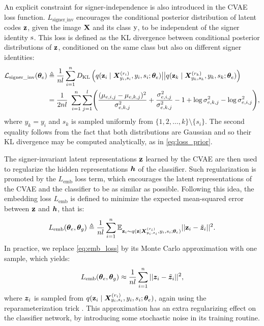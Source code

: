 An explicit constraint for signer-independence is also introduced in the CVAE loss function. $L_{\text{signer\_inv}}$ encourages the conditional posterior distribution of latent codes ${\mathbf{z}}$, given the image ${\mathbf{X}}$ and its class ${\textnormal{y}}$, to be independent of the signer identity ${\textnormal{s}}$. This loss is defined as the KL divergence between conditional posterior distributions of ${\mathbf{z}}$, conditioned on the same class but also on different signer identities:
\begin{align}
    \label{eq:loss_signer_inv}
    \mathcal{L}_{\text{signer\_inv}}({\bm{\theta}}_{e}) &\triangleq \frac{1}{nl} \sum_{i=1}^{n}D_{\mathrm{KL}}\left(q({\mathbf{z}}_{i} \mid {\bm{X}}^{(r_{i})}_{y_{i},s_{i}}, y_{i}, s_{i}; {\bm{\theta}}_e) \big| \big| q({\mathbf{z}}_{k} \mid {\bm{X}}^{(r_{k})}_{y_{k},s_{k}}, y_{k}, s_{k}; {\bm{\theta}}_e)\right) \nonumber\\
    &=\frac{1}{2nl}~\sum_{i=1}^{n}\sum_{j=1}^{l} \Biggl(\frac{(\mu_{e,i,j} - \mu_{e,k,j})^2}{\sigma_{e,k,j}^2} + \frac{\sigma_{e,i,j}^2}{\sigma_{e,k,j}^2} -1 + \log \sigma_{e,k,j}^2 - \log \sigma_{e,i,j}^2 \Biggr),
\end{align}
where $y_{k}=y_{i}$ and $s_k$ is sampled uniformly from $\{1,2,\dots,k\} \setminus \lbrace s_i \rbrace$. The second equality follows from the fact that both distributions are Gaussian and so their KL divergence may be computed analytically, as in \eqref{eq:loss_prior}.

The signer-invariant latent representations ${\mathbf{z}}$ learned by the CVAE are then used to regularize the hidden representations ${\bm{h}}$ of the classifier. Such regularization is promoted by the $L_{\text{emb}}$ loss term, which encourages the latent representations of the CVAE and the classifier to be as similar as possible. Following this idea, the embedding loss $L_{\text{emb}}$ is defined to minimize the expected mean-squared error between ${\mathbf{z}}$ and ${\bm{h}}$, that is:
\begin{equation}
    \label{eq:emb_loss}
    L_{\text{emb}}({\bm{\theta}}_e, {\bm{\theta}}_g) \triangleq \frac{1}{nl} \sum_{i=1}^{n} \mathbb{E}_{{\mathbf{z}}_{i} \sim q({\mathbf{z}} \mid {\bm{X}}^{(r_{i})}_{y_{i},s_{i}}, y_{i}, s_{i}; {\bm{\theta}}_e)}||{\mathbf{z}}_i-\tilde{{\bm{z}}}_i||^2.
\end{equation}
In practice, we replace \eqref{eq:emb_loss} by its Monte Carlo approximation with one sample, which yields:
\begin{equation}
    L_{\text{emb}}({\bm{\theta}}_e, {\bm{\theta}}_g) \approx \frac{1}{nl} \sum_{i=1}^{n}||{\bm{z}}_i-\tilde{{\bm{z}}}_i||^2,
\end{equation}
where ${\bm{z}}_i$ is sampled from $q({\mathbf{z}}_{i} \mid {\bm{X}}^{(r_{i})}_{y_{i},s_{i}}, y_{i}, s_{i}; {\bm{\theta}}_e)$, again using the reparameterization trick . This approximation has an extra regularizing effect on the classifier network, by introducing some stochastic noise in its training routine.

